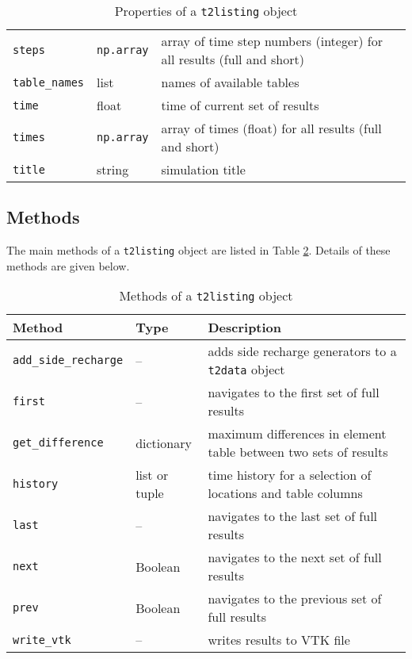 \begin{table}
\begin{center}
\begin{tabular}{|l|l|p{70mm}|}
      \texttt{steps} & \texttt{np.array} & array of time step numbers (integer) for all results (full and short)\\
      \texttt{table\_names} & list & names of available tables\\
      \texttt{time} & float & time of current set of results\\
      \texttt{times} & \texttt{np.array} & array of times (float) for all results (full and short)\\
      \texttt{title} & string & simulation title\\
      \hline
    \end{tabular}
    \caption{Properties of a \texttt{t2listing} object}
    \label{tb:t2listing_properties}
  \end{center}
\end{table}

\subsection{Methods}
\label{t2listingmethods}

The main methods of a \texttt{t2listing} object are listed in Table \ref{tb:t2listing_methods}.  Details of these methods are given below.

\begin{table}
  \begin{center}
    \begin{tabular}{|l|l|p{80mm}|}
      \hline
      \textbf{Method} & \textbf{Type} & \textbf{Description}\\
      \hline
      \texttt{add\_side\_recharge} & -- & adds side recharge generators to a \texttt{t2data} object\\
      \texttt{first} & -- & navigates to the first set of full results\\
      \texttt{get\_difference} & dictionary & maximum differences in element table between two sets of results\\
      \texttt{history} & list or tuple & time history for a selection of locations and table columns\\
      \texttt{last} & -- & navigates to the last set of full results\\
      \texttt{next} & Boolean & navigates to the next set of full results\\
      \texttt{prev} & Boolean & navigates to the previous set of full results\\
      \texttt{write\_vtk} & -- & writes results to VTK file\\
      \hline
    \end{tabular}
    \caption{Methods of a \texttt{t2listing} object}
    \label{tb:t2listing_methods}
  \end{center}
\end{table}

